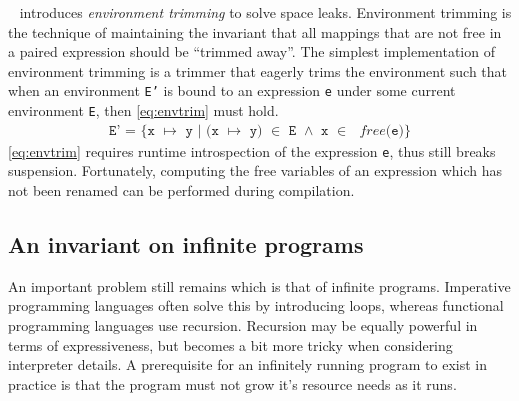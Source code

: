 ~\cite{sestoft1997deriving} introduces \textit{environment trimming} to solve space leaks.
Environment trimming is the technique of maintaining the invariant that all mappings that are not free in a paired expression should be ``trimmed away''.
The simplest implementation of environment trimming is a trimmer that eagerly trims the environment such that when an environment \texttt{E'} is bound to an expression \texttt{e} under some current environment \texttt{E}, then \autoref{eq:envtrim} must hold.
\begin{align}
  \texttt{E' = \{x $\mapsto$ y | (x $\mapsto$ y) $\in$ E $\land$ x $\in$ }\textit{free}\texttt{(e)\}}\label{eq:envtrim}
\end{align}
\autoref{eq:envtrim} requires runtime introspection of the expression \texttt{e}, thus still breaks suspension.
Fortunately, computing the free variables of an expression which has not been renamed can be performed during compilation.

\subsection{An invariant on infinite programs}\label{subsec:inf}
An important problem still remains which is that of infinite programs.
Imperative programming languages often solve this by introducing loops, whereas functional programming languages use recursion.
Recursion may be equally powerful in terms of expressiveness, but becomes a bit more tricky when considering interpreter details.
A prerequisite for an infinitely running program to exist in practice is that the program must not grow it's resource needs as it runs.

